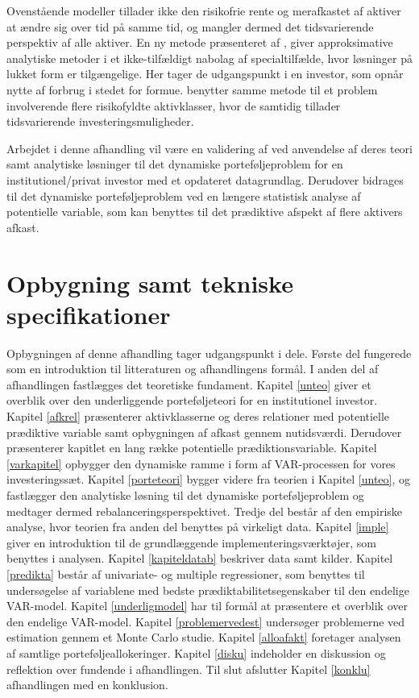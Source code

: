 \documentclass[
  a4paper,
  oneside]{memoir}
\begin{document}
Ovenstående modeller tillader ikke den risikofrie rente og merafkastet af aktiver at ændre sig over tid på samme tid, og mangler dermed det tidsvarierende perspektiv af alle aktiver. En ny metode præsenteret af \citep{CampVic1999, CampVic2001, CampVic2003}, giver approksimative analytiske metoder i et ikke-tilfældigt nabolag af specialtilfælde, hvor løsninger på lukket form er tilgængelige. Her tager de udgangspunkt i en investor, som opnår nytte af forbrug i stedet for formue. \citep{CampVicCha2003} benytter samme metode til et problem involverende flere risikofyldte aktivklasser, hvor de samtidig tillader tidsvarierende investeringsmuligheder.

Arbejdet i denne afhandling vil være en validering af \citep{JurVic2011} ved anvendelse af deres teori samt analytiske løsninger til det dynamiske porteføljeproblem for en institutionel/privat investor med et opdateret datagrundlag. Derudover bidrages til det dynamiske porteføljeproblem ved en længere statistisk analyse af potentielle variable, som kan benyttes til det prædiktive afspekt af flere aktivers afkast.

\hypertarget{opbygning-samt-tekniske-specifikationer}{%
\section{Opbygning samt tekniske specifikationer}\label{opbygning-samt-tekniske-specifikationer}}

Opbygningen af denne afhandling tager udgangspunkt i dele. Første del fungerede som en introduktion til litteraturen og afhandlingens formål. I anden del af afhandlingen fastlægges det teoretiske fundament. Kapitel \ref{unteo} giver et overblik over den underliggende porteføljeteori for en institutionel investor. Kapitel \ref{afkrel} præsenterer aktivklasserne og deres relationer med potentielle prædiktive variable samt opbygningen af afkast gennem nutidsværdi. Derudover præsenterer kapitlet en lang række potentielle prædiktionsvariable. Kapitel \ref{varkapitel} opbygger den dynamiske ramme i form af VAR-processen for vores investeringssæt. Kapitel \ref{porteteori} bygger videre fra teorien i Kapitel \ref{unteo}, og fastlægger den analytiske løsning til det dynamiske porteføljeproblem og medtager dermed rebalanceringsperspektivet. Tredje del består af den empiriske analyse, hvor teorien fra anden del benyttes på virkeligt data. Kapitel \ref{imple} giver en introduktion til de grundlæggende implementeringsværktøjer, som benyttes i analysen. Kapitel \ref{kapiteldatab} beskriver data samt kilder. Kapitel \ref{predikta} består af univariate- og multiple regressioner, som benyttes til undersøgelse af variablene med bedste prædiktabilitetsegenskaber til den endelige VAR-model. Kapitel \ref{underligmodel} har til formål at præsentere et overblik over den endelige VAR-model. Kapitel \ref{problemervedest} undersøger problemerne ved estimation gennem et Monte Carlo studie. Kapitel \ref{alloafakt} foretager analysen af samtlige porteføljeallokeringer. Kapitel \ref{disku} indeholder en diskussion og reflektion over fundende i afhandlingen. Til slut afslutter Kapitel \ref{konklu} afhandlingen med en konklusion.
\end{document}
